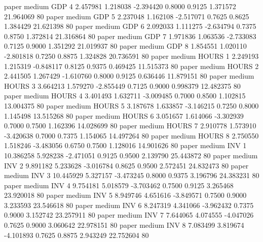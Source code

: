                  paper     medium      GDP                 4  2.457981 1.218038 -2.394420 0.8000 0.9125  1.371572   21.964069 80
                 paper     medium      GDP                 5  2.237048 1.162108 -2.517071 0.7625 0.8625  1.384429   21.621398 80
                 paper     medium      GDP                 6  2.092033 1.111275 -2.634794 0.7375 0.8750  1.372814   21.316864 80
                 paper     medium      GDP                 7  1.971836 1.063536 -2.733083 0.7125 0.9000  1.351292   21.019937 80
                 paper     medium      GDP                 8  1.854551 1.020110 -2.801818 0.7250 0.8875  1.324828   20.736591 80
                 paper     medium    HOURS                 1  2.249193 1.215319 -0.848117 0.8125 0.9375  0.469425   11.515373 80
                 paper     medium    HOURS                 2  2.441505 1.267429 -1.610760 0.8000 0.9125  0.636446   11.879151 80
                 paper     medium    HOURS                 3  3.664213 1.579270 -2.855449 0.7125 0.9000  0.998379   12.482375 80
                 paper     medium    HOURS                 4  3.401493 1.632711 -3.009485 0.7000 0.8500  1.102815   13.004375 80
                 paper     medium    HOURS                 5  3.187678 1.633857 -3.146215 0.7250 0.8000  1.145498   13.515268 80
                 paper     medium    HOURS                 6  3.051657 1.614066 -3.302939 0.7000 0.7500  1.162396   14.028699 80
                 paper     medium    HOURS                 7  2.910778 1.573910 -3.420638 0.7000 0.7375  1.154065   14.497264 80
                 paper     medium    HOURS                 8  2.750550 1.518246 -3.483056 0.6750 0.7500  1.128016   14.901626 80
                 paper     medium      INV                 1 10.386258 5.928238 -2.471051 0.9125 0.9500  2.139790   25.443872 80
                 paper     medium      INV                 2  9.891182 5.233628 -3.016784 0.8625 0.9500  2.572451   24.832473 80
                 paper     medium      INV                 3 10.445929 5.327157 -3.473245 0.8000 0.9375  3.196796   24.383231 80
                 paper     medium      INV                 4  9.754181 5.018579 -3.703462 0.7500 0.9125  3.265468   23.920018 80
                 paper     medium      INV                 5  8.949746 4.651616 -3.849571 0.7500 0.9000  3.233593   23.546618 80
                 paper     medium      INV                 6  8.247319 4.341066 -3.962432 0.7375 0.9000  3.152742   23.257911 80
                 paper     medium      INV                 7  7.644065 4.074555 -4.047026 0.7625 0.9000  3.060642   22.978151 80
                 paper     medium      INV                 8  7.083499 3.819674 -4.101893 0.7625 0.8875  2.943249   22.752604 80
